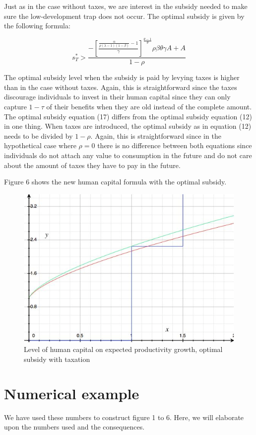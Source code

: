 \documentclass[a4paper,11pt]{article} %
\begin{document}
Just as in the case without taxes, we are interest in the subsidy needed to make sure the low-development trap does not occur. The optimal subsidy is given by the following formula:

\begin{equation}
  s^*_T > \frac{
    - \left[\frac{
        \frac{\alpha}{\rho(\lambda-1)(1-\beta)}-1
      }{\gamma} \right]
    ^{\frac{\theta-1}{\theta}} \rho\beta\theta\gamma A + A
  }{1-\rho}
\end{equation}

The optimal subsidy level when the subsidy is paid by levying taxes is higher than in the case without taxes. Again, this is straightforward since the taxes discourage individuals to invest in their human capital since they can only capture \(1-\tau\) of their benefits when they are old instead of the complete amount. The optimal subsidy equation (17) differs from the optimal subsidy equation (12) in one thing. When taxes are introduced, the optimal subsidy as in equation (12) needs to be divided by \(1-\rho\). Again, this is straightforward since in the hypothetical case where \(\rho=0\) there is no difference between both equations since individuals do not attach any value to consumption in the future and do not care about the amount of taxes they have to pay in the future. 

Figure 6 shows the new human capital formula with the optimal subsidy. 

\begin{figure}
  \centering
  \includegraphics{figure6.png}
  \caption{Level of human capital on expected productivity growth, optimal subsidy with taxation}
\end{figure}

\section{Numerical example}
We have used these numbers to construct figure 1 to 6. Here, we will elaborate upon the numbers used and the consequences. 
\end{document}
